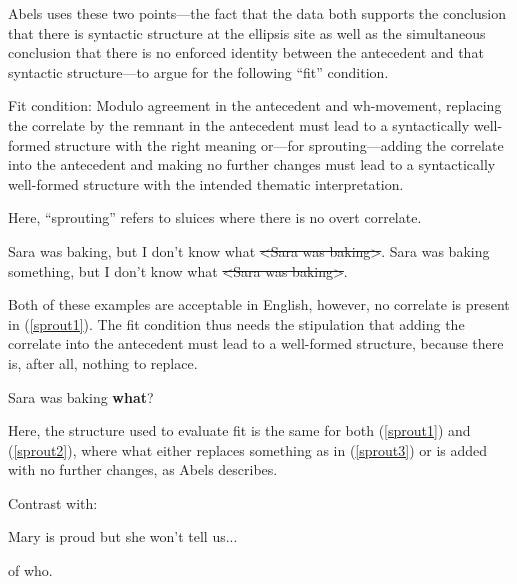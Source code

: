 \documentclass{turabian-researchpaper}
\begin{document}
Abels uses these two points---the fact that the data both supports the conclusion that there is syntactic structure at the ellipsis site as well as the simultaneous conclusion that there is no enforced identity between the antecedent and that syntactic structure---to argue for the following ``fit'' condition.  

\begin{exe}
\ex\label{fitcond} Fit condition: Modulo agreement in the antecedent and wh-movement, replacing the correlate by the remnant in the antecedent must lead to a syntactically well-formed structure with the right meaning or---for sprouting---adding the correlate into the antecedent and making no further changes must lead to a syntactically well-formed structure with the intended thematic interpretation. 
\end{exe}

Here, ``sprouting'' refers to sluices where there is no overt correlate. 

\begin{exe}
\ex
\begin{xlist}
\ex\label{sprout1} Sara was baking, but I don't know what \sout{\textless Sara was baking\textgreater}.
\ex\label{sprout2} Sara was baking something, but I don't know what \sout{\textless Sara was baking\textgreater}.
\end{xlist}
\end{exe} 

Both of these examples are acceptable in English, however, no correlate is present in (\ref{sprout1}). The fit condition thus needs the stipulation that adding the correlate into the antecedent must lead to a well-formed structure, because there is, after all, nothing to replace. 

\begin{exe}
\ex\label{sprout3} Sara was baking \textbf{what}? 
\end{exe}

Here, the structure used to evaluate fit is the same for both (\ref{sprout1}) and (\ref{sprout2}), where what either replaces something as in (\ref{sprout3}) or is added with no further changes, as Abels describes. 

Contrast with:
\begin{exe}
\ex\label{maryisproud} Mary is proud but she won't tell us...
\begin{xlist}
\ex of who.
\end{xlist}
\end{exe}
\end{document}

